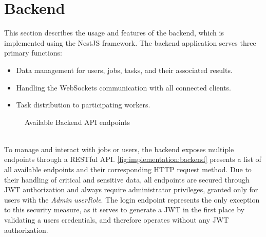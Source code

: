 \section{Backend}
\label{sec:implementation:backend}
This section describes the usage and features of the backend, which is implemented using the NestJS \cite{methodology:nestjs} framework. The backend application serves three primary functions: 
\begin{itemize}
    \item Data management for users, jobs, tasks, and their associated results.
    \item Handling the WebSockets communication with all connected clients.
    \item Task distribution to participating workers.
\end{itemize}
\begin{figure}[bth]
    \myfloatalign
     \quad \quad
    \caption{Available Backend \acs{API} endpoints}
    \label{fig:implementation:backend}
\end{figure}
~\\
To manage and interact with jobs or users, the backend exposes multiple endpoints through a \acs{REST}ful \ac{API}. \autoref{fig:implementation:backend} presents a list of all available endpoints and their corresponding \acs{HTTP} request method. Due to their handling of critical and sensitive data, all endpoints are secured through \ac{JWT} authorization and always require administrator privileges, granted only for users with the \emph{Admin} \emph{userRole}. The login endpoint represents the only exception to this security measure, as it serves to generate a \ac{JWT} in the first place by validating a users credentials, and therefore operates without any \ac{JWT} authorization.

